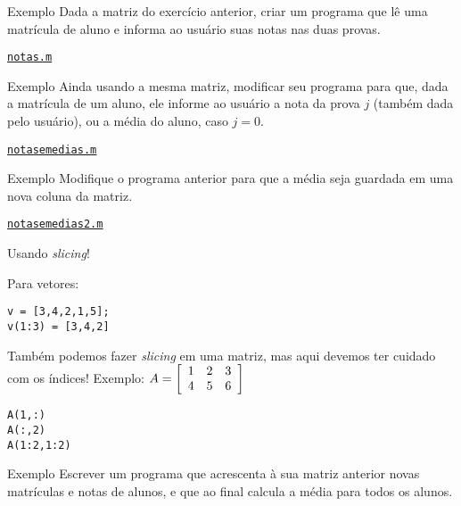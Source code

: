 \documentclass[hyperref={pdfpagelabels=false}]{beamer}
\begin{document}
\begin{frame}{Exemplo}
  Dada a matriz do exercício anterior, criar um programa que lê uma matrícula de aluno e informa ao usuário suas notas nas duas provas.

	\begin{center} \href{listings/notas.m}{\underline{\texttt{notas.m}}} \end{center}
\end{frame}

\begin{frame}{Exemplo}
  Ainda usando a mesma matriz, modificar seu programa para que, dada a matrícula de um aluno, ele informe ao usuário a nota da prova $j$ (também dada pelo usuário), ou a média do aluno, caso $j=0$.

	\begin{center} \href{listings/notasemedias.m}{\underline{\texttt{notasemedias.m}}} \end{center}
\end{frame}

\begin{frame}{Exemplo}
  Modifique o programa anterior para que a média seja guardada em uma nova coluna da matriz.

	\begin{center} \href{listings/notasemedias2.m}{\underline{\texttt{notasemedias2.m}}} \end{center}
\end{frame}

\begin{frame}{Usando \emph{slicing}!}
   
  Para vetores: \\
  \begin{center}
		{\texttt{v = [3,4,2,1,5];}}\\
		{\texttt{v(1:3) = [3,4,2]}}
  \end{center}
  
	Também podemos fazer \emph{slicing} em uma matriz, mas aqui devemos ter
  cuidado com os índices!
  \vfill
	Exemplo: $A = \left[ \begin{array}{c c c} 1 & 2 & 3\\ 4 & 5 & 6\end{array}
      \right]$\\
	\begin{center}
	  {\texttt{A(1,:)}}\\
	  {\texttt{A(:,2)}}\\
		{\texttt{A(1:2,1:2)}}
	\end{center}
\end{frame}

\begin{frame}{Exemplo}
  Escrever um programa que acrescenta à sua matriz anterior novas matrículas e notas de alunos, e que ao final calcula a média para todos os alunos.
\end{frame}
\end{document}
